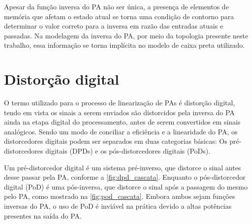 Apesar da função inversa do PA não ser única, a presença de elementos de memória que afetam o estado atual se torna uma condição de contorno para determinar o valor correto para a inversa em razão das entradas atuais e passadas. Na modelagem da inversa do PA, por meio da topologia presente neste trabalho, essa informação se torna implícita no modelo de caixa preta utilizado.

\section{Distorção digital} \label{sec:fundteo-distor}
O termo utilizado para o processo de linearização de PAs é distorção digital, tendo em vista os sinais a serem enviados são distorcidos pela inversa do PA ainda na etapa digital do processamento, antes de serem convertidos em sinais analógicos. Sendo um modo de conciliar a eficiência e a linearidade do PA, os distorcedores digitais podem ser separados em duas categorias básicas: Os pré-distorcedores digitais (DPDs) e os pós-distorcedores digitais (PoDs).

Um pré-distorcedor digital é um sistema pré-inverso, que distorce o sinal antes desse passar pela PA, conforme a \autoref{fig:dpd_cascata}. Enquanto o pós-distorcedor digital (PoD) é uma pós-inversa, que distorce o sinal após a passagem do mesmo pelo PA, como mostrado na \autoref{fig:pod_cascata}. Embora ambos sejam funções inversas do PA, o uso de PoD é inviável na prática devido a altas potências presentes na saída do PA.



